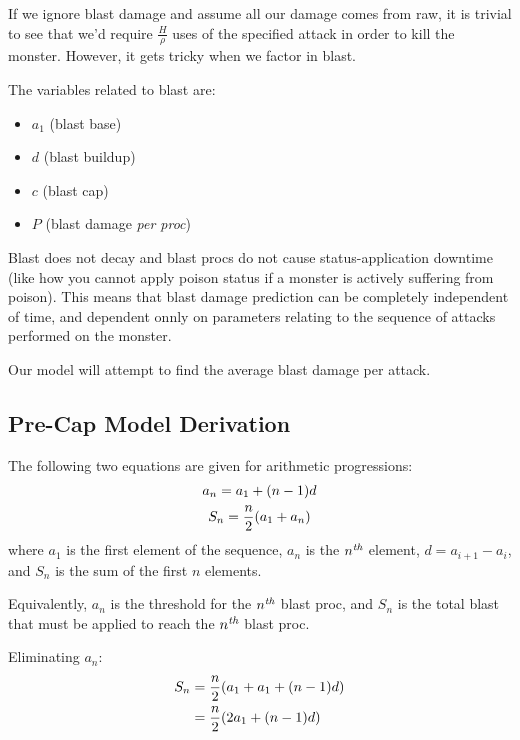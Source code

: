\documentclass{article}
\begin{document}
If we ignore blast damage and assume all our damage comes from raw, it is trivial to see that we'd require $\frac{H}{\rho}$ uses of the specified attack in order to kill the monster. However, it gets tricky when we factor in blast.

The variables related to blast are:
\begin{itemize}
    \item $a_1$ (blast base)
    \item $d$ (blast buildup)
    \item $c$ (blast cap)
    \item $P$ (blast damage \textit{per proc})
\end{itemize}

Blast does not decay and blast procs do not cause status-application downtime (like how you cannot apply poison status if a monster is actively suffering from poison). This means that blast damage prediction can be completely independent of time, and dependent onnly on parameters relating to the sequence of attacks performed on the monster.

Our model will attempt to find the average blast damage per attack.


\subsection{Pre-Cap Model Derivation}%
\label{sub:pre_cap_model_derivation}

The following two equations are given for arithmetic progressions:
\begin{gather}
    a_n = a_1 + \parens*{n - 1} d
        \label{eq:arithmetic_progression_element}
    \\
    S_n = \frac{n}{2} \parens*{a_1 + a_n}
        \label{eq:arithmetic_progression_sum}
\end{gather}
where $a_1$ is the first element of the sequence, $a_n$ is the ${n}^\textit{th}$ element, $d = a_{i+1} - a_{i}$, and $S_n$ is the sum of the first $n$ elements.

Equivalently, $a_n$ is the threshold for the ${n}^\textit{th}$ blast proc, and $S_n$ is the total blast that must be applied to reach the ${n}^\textit{th}$ blast proc.

Eliminating $a_n$:
\begin{align}
    S_n &= \frac{n}{2} \parens*{a_1 + a_1 + \parens*{n - 1} d} \\
        &= \frac{n}{2} \parens*{2 a_1 + \parens*{n - 1} d}
\end{align}
\end{document}
